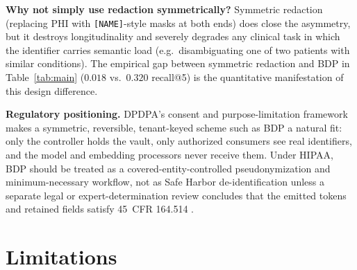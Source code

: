 \documentclass[11pt,a4paper]{article}
\begin{document}
\textbf{Why not simply use redaction symmetrically?} Symmetric redaction
(replacing PHI with \texttt{[NAME]}-style masks at both ends) does close
the asymmetry, but it destroys longitudinality and severely degrades any
clinical task in which the identifier carries semantic load (e.g.\
disambiguating one of two patients with similar conditions). The empirical
gap between symmetric redaction and BDP in Table~\ref{tab:main}
($0.018$ vs.\ $0.320$ recall@5) is the quantitative manifestation of this
design difference.

\textbf{Regulatory positioning.} DPDPA's consent and purpose-limitation
framework \cite{meity_dpdpa_2023} makes a symmetric, reversible,
tenant-keyed scheme such as BDP a natural fit: only the controller holds
the vault, only authorized consumers see real identifiers, and the model
and embedding processors never receive them. Under HIPAA, BDP should be
treated as a covered-entity-controlled pseudonymization and
minimum-necessary workflow, not as Safe Harbor de-identification unless a
separate legal or expert-determination review concludes that the emitted
tokens and retained fields satisfy 45~CFR 164.514 \cite{hhs_hipaa_deid_guidance}.

\section{Limitations}
\label{sec:limitations}
\end{document}
